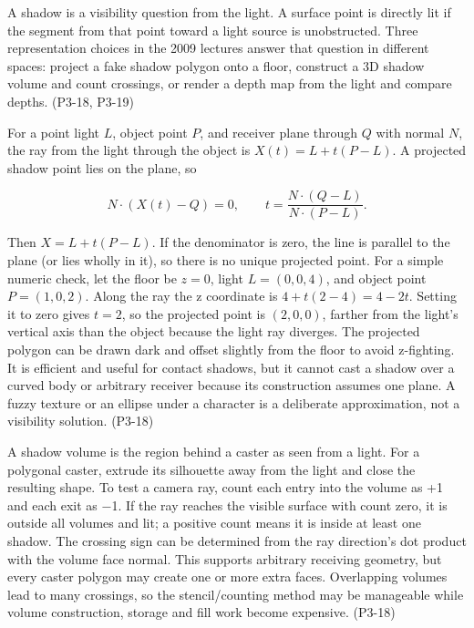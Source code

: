 \hypertarget{03-visual-computing-i-ch011-shadow-representations-geometry-volumes-and-depth-maps}{}

A shadow is a visibility question from the light. A surface point is directly lit if the segment from that point toward a light source is unobstructed. Three representation choices in the 2009 lectures answer that question in different spaces: project a fake shadow polygon onto a floor, construct a 3D shadow volume and count crossings, or render a depth map from the light and compare depths. (P3-18, P3-19)

For a point light \(L\), object point \(P\), and receiver plane through \(Q\) with normal \(N\), the ray from the light through the object is \(X(t)=L+t(P-L)\). A projected shadow point lies on the plane, so

\[
N\cdot(X(t)-Q)=0,\qquad t=\frac{N\cdot(Q-L)}{N\cdot(P-L)}.
\]

Then \(X=L+t(P-L)\). If the denominator is zero, the line is parallel to the plane (or lies wholly in it), so there is no unique projected point. For a simple numeric check, let the floor be \(z=0\), light \(L=(0,0,4)\), and object point \(P=(1,0,2)\). Along the ray the z coordinate is \(4+t(2-4)=4-2t\). Setting it to zero gives \(t=2\), so the projected point is \((2,0,0)\), farther from the light's vertical axis than the object because the light ray diverges. The projected polygon can be drawn dark and offset slightly from the floor to avoid z-fighting. It is efficient and useful for contact shadows, but it cannot cast a shadow over a curved body or arbitrary receiver because its construction assumes one plane. A fuzzy texture or an ellipse under a character is a deliberate approximation, not a visibility solution. (P3-18)

A shadow volume is the region behind a caster as seen from a light. For a polygonal caster, extrude its silhouette away from the light and close the resulting shape. To test a camera ray, count each entry into the volume as +1 and each exit as −1. If the ray reaches the visible surface with count zero, it is outside all volumes and lit; a positive count means it is inside at least one shadow. The crossing sign can be determined from the ray direction's dot product with the volume face normal. This supports arbitrary receiving geometry, but every caster polygon may create one or more extra faces. Overlapping volumes lead to many crossings, so the stencil/counting method may be manageable while volume construction, storage and fill work become expensive. (P3-18)

